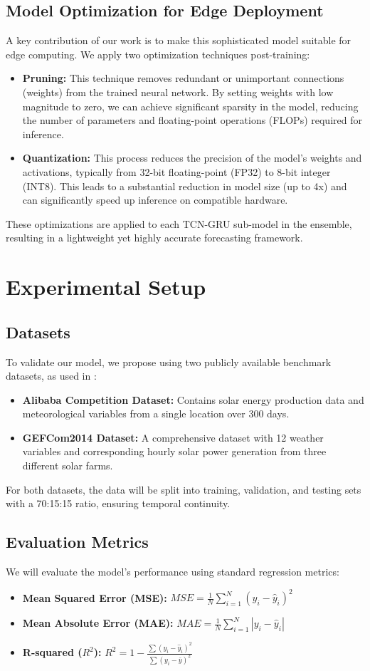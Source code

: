 \documentclass[conference]{IEEEtran}
\begin{document}
\subsection{Model Optimization for Edge Deployment}
A key contribution of our work is to make this sophisticated model suitable for edge computing. We apply two optimization techniques post-training:
\begin{itemize}
    \item \textbf{Pruning:} This technique removes redundant or unimportant connections (weights) from the trained neural network. By setting weights with low magnitude to zero, we can achieve significant sparsity in the model, reducing the number of parameters and floating-point operations (FLOPs) required for inference.
    \item \textbf{Quantization:} This process reduces the precision of the model's weights and activations, typically from 32-bit floating-point (FP32) to 8-bit integer (INT8). This leads to a substantial reduction in model size (up to 4x) and can significantly speed up inference on compatible hardware.
\end{itemize}
These optimizations are applied to each TCN-GRU sub-model in the ensemble, resulting in a lightweight yet highly accurate forecasting framework.

\section{Experimental Setup}
\subsection{Datasets}
To validate our model, we propose using two publicly available benchmark datasets, as used in \cite{b2}:
\begin{itemize}
    \item \textbf{Alibaba Competition Dataset:} Contains solar energy production data and meteorological variables from a single location over 300 days.
    \item \textbf{GEFCom2014 Dataset:} A comprehensive dataset with 12 weather variables and corresponding hourly solar power generation from three different solar farms.
\end{itemize}
For both datasets, the data will be split into training, validation, and testing sets with a 70:15:15 ratio, ensuring temporal continuity.

\subsection{Evaluation Metrics}
We will evaluate the model's performance using standard regression metrics:
\begin{itemize}
    \item \textbf{Mean Squared Error (MSE):} $MSE = \frac{1}{N} \sum_{i=1}^{N} (y_i - \hat{y}_i)^2$
    \item \textbf{Mean Absolute Error (MAE):} $MAE = \frac{1}{N} \sum_{i=1}^{N} |y_i - \hat{y}_i|$
    \item \textbf{R-squared ($R^2$):} $R^2 = 1 - \frac{\sum (y_i - \hat{y}_i)^2}{\sum (y_i - \bar{y})^2}$
\end{itemize}
\end{document}
